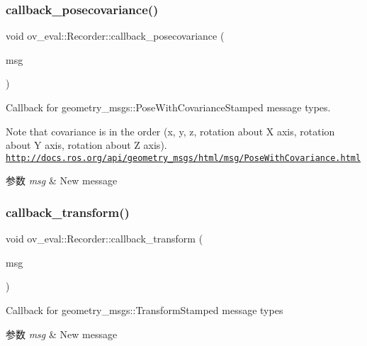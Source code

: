\subsubsection{\texorpdfstring{callback\+\_\+posecovariance()}{callback\_posecovariance()}}
{\footnotesize\ttfamily void ov\+\_\+eval\+::\+Recorder\+::callback\+\_\+posecovariance (\begin{DoxyParamCaption}\item[{const geometry\+\_\+msgs\+::\+Pose\+With\+Covariance\+Stamped\+Ptr \&}]{msg }\end{DoxyParamCaption})\hspace{0.3cm}{\ttfamily [inline]}}



Callback for geometry\+\_\+msgs\+::\+Pose\+With\+Covariance\+Stamped message types. 

Note that covariance is in the order (x, y, z, rotation about X axis, rotation about Y axis, rotation about Z axis). \href{http://docs.ros.org/api/geometry_msgs/html/msg/PoseWithCovariance.html}{\tt http\+://docs.\+ros.\+org/api/geometry\+\_\+msgs/html/msg/\+Pose\+With\+Covariance.\+html}


\begin{DoxyParams}{参数}
{\em msg} & New message \\
\hline
\end{DoxyParams}
\mbox{\label{classov__eval_1_1Recorder_aa98f2bf8b8f3bfc70c905d83a778065b}} 
\subsubsection{\texorpdfstring{callback\+\_\+transform()}{callback\_transform()}}
{\footnotesize\ttfamily void ov\+\_\+eval\+::\+Recorder\+::callback\+\_\+transform (\begin{DoxyParamCaption}\item[{const geometry\+\_\+msgs\+::\+Transform\+Stamped\+Ptr \&}]{msg }\end{DoxyParamCaption})\hspace{0.3cm}{\ttfamily [inline]}}



Callback for geometry\+\_\+msgs\+::\+Transform\+Stamped message types 


\begin{DoxyParams}{参数}
{\em msg} & New message \\
\hline
\end{DoxyParams}
